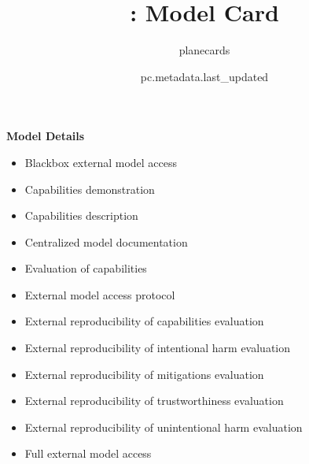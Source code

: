 \documentclass{article}
\title{\VAR{pc.metadata.name}: Model Card}
\author{planecards}
\date{pc.metadata.last_updated}
\begin{document}
\newenvironment{mcsection}[1]
    {
        \textbf{#1}


        \begin{itemize}[leftmargin=*,topsep=0pt,itemsep=-1ex,partopsep=1ex,parsep=1ex,after=\vspace{\medskipamount}]
    }
    {
        \end{itemize}
    }

\begin{adjustwidth}{-60pt}{-30pt}
\begin{singlespace}

\begin{tcolorbox}[title=\textbf{\VAR{pc.metadata.name} : Model Card},
    breakable, sharp corners, boxrule=0.7pt]

\begin{mcsection}{Model Details}
    \item Blackbox external model access 
    \item Capabilities demonstration 
    \item Capabilities description 
    \item Centralized model documentation 
    \item Evaluation of capabilities 
    \item External model access protocol 
    \item External reproducibility of capabilities evaluation 
    \item External reproducibility of intentional harm evaluation 
    \item External reproducibility of mitigations evaluation 
    \item External reproducibility of trustworthiness evaluation 
    \item External reproducibility of unintentional harm evaluation 
    \item Full external model access 

\end{mcsection}
\end{tcolorbox}
\end{singlespace}
\end{adjustwidth}
\end{document}

